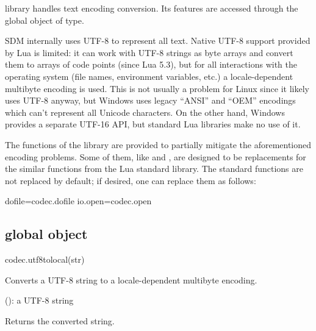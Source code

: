 \documentclass[a4paper,12pt,twoside,extrafontsizes]{memoir}
\begin{document}
 library handles text encoding conversion. Its features are accessed through the  global object of  type.

SDM internally uses UTF-8 to represent all text. Native UTF-8 support provided by Lua is limited: it can work with UTF-8 strings as byte arrays and convert them to arrays of code points (since Lua 5.3), but for all interactions with the operating system (file names, environment variables, etc.) a locale-dependent multibyte encoding is used. This is not usually a problem for Linux since it likely uses UTF-8 anyway, but Windows uses legacy ``ANSI'' and ``OEM'' encodings which can't represent all Unicode characters. On the other hand, Windows provides a separate UTF-16 API, but standard Lua libraries make no use of it.

The functions of the  library are provided to partially mitigate the aforementioned encoding problems. Some of them, like  and , are designed to be replacements for the similar functions from the Lua standard library. The standard functions are not replaced by default; if desired, one can replace them as follows:

\begin{shellcmds}\begin{luacode}
dofile=codec.dofile
io.open=codec.open
\end{luacode}\end{shellcmds}

\subsection{ global object}
\label{subsec:codec}


\begin{luafuncprototype}
codec.utf8tolocal(str)
\end{luafuncprototype}

\begin{funcdescr}
	Converts a UTF-8 string to a locale-dependent multibyte encoding.
\end{funcdescr}

\begin{funcparams}
	 (): a UTF-8 string
\end{funcparams}

\begin{funcret}
	Returns the converted string.
\end{funcret}
\end{document}
